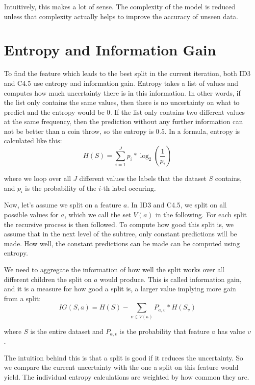\documentclass[a4paper]{article}
\begin{document}
Intuitively, this makes a lot of sense. The complexity of the model is reduced unless that complexity actually helps to improve the accuracy of unseen data.

\section{Entropy and Information Gain}
\label{sec:entropy}

To find the feature which leads to the best split in the current iteration, both ID3 and C4.5 use entropy and information gain. Entropy takes a list of values and computes how much uncertainty there is in this information. In other words, if the list only contains the same values, then there is no uncertainty on what to predict and the entropy would be $0$. If the list only contains two different values at the same frequency, then the prediction without any further information can not be better than a coin throw, so the entropy is $0.5$. In a formula, entropy is calculated like this:
\[
	H(S) = \sum\limits_{i = 1}^J p_i * \log_2\left(\frac{1}{p_i}\right)
\]

\noindent where we loop over all $J$ different values the labels that the dataset $S$ contains, and $p_i$ is the probability of the $i$-th label occuring.

Now, let's assume we split on a feature $a$. In ID3 and C4.5, we split on all possible values for $a$, which we call the set $V(a)$ in the following. For each split the recursive process is then followed. To compute how good this split is, we assume that in the next level of the subtree, only constant predictions will be made. How well, the constant predictions can be made can be computed using entropy.

We need to aggregate the information of how well the split works over all different children the split on $a$ would produce. This is called information gain, and it is a measure for how good a split is, a larger value implying more gain from a split:
\[
	\mathit{IG}(S, a) = H(S) - \sum\limits_{v \in V(a)} P_{a, v} * H(S_v)
\]

\noindent where $S$ is the entire dataset and $P_{a, v}$ is the probability that feature $a$ has value $v$.

The intuition behind this is that a split is good if it reduces the uncertainty. So we compare the current uncertainty with the one a split on this feature would yield. The individual entropy calculations are weighted by how common they are.
\end{document}

